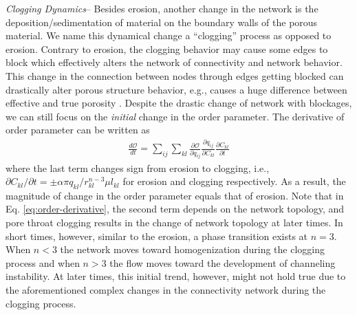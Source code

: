 \documentclass[%
 reprint,
 amsmath,amssymb,
 aps,
]{revtex4-1}
\begin{document}
%
\textit{Clogging Dynamics}-- Besides erosion, another change in the network is the deposition/sedimentation of material on the boundary walls of the porous material. We name this dynamical change a ``clogging'' process as opposed to erosion. Contrary to erosion, the clogging behavior may cause some edges to block which effectively alters the network of connectivity and network behavior. This change in the connection between nodes through edges getting blocked can drastically alter porous structure behavior, e.g., causes a huge difference between effective and true porosity \cite{shima2021}. Despite the drastic change of network with blockages, we can still focus on the \textit{initial} change in the order parameter. The derivative of order parameter can be written as 
%
\begin{align}
    \frac{d\mathcal{O}}{dt} = \sum_{ij} \sum_{kl} \frac{\partial \mathcal{O}}{\partial q_{ij}} \frac{\partial q_{ij}}{\partial C_{kl}}  \frac{\partial C_{kl}}{\partial t} \label{eq:order-derivative}
\end{align}
%
where the last term changes sign from erosion to clogging, i.e., $\partial C_{kl}/\partial t = \pm \alpha \pi q_{kl} /r_{kl}^{n-3}\mu l_{kl}$ for erosion and clogging respectively. As a result, the magnitude of change in the order parameter equals that of erosion. Note that in Eq. \eqref{eq:order-derivative}, the second term depends on the network topology, and pore throat clogging results in the change of network topology at later times.
In short times, however, similar to the erosion, a phase transition exists at $n=3$. When  $n<3$ the network moves toward homogenization during the clogging process and when $n>3$ the flow moves toward the development of channeling instability. At later times, this initial trend, however, might not hold true due to the aforementioned complex changes in the connectivity network during the clogging process. 
\end{document}
